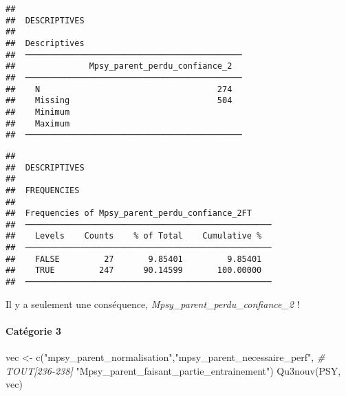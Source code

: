 \documentclass[
]{article}
\newenvironment{Shaded}{\begin{snugshade}}{\end{snugshade}}
\newcommand{\CommentTok}[1]{\textcolor[rgb]{0.56,0.35,0.01}{\textit{#1}}}
\newcommand{\FunctionTok}[1]{\textcolor[rgb]{0.00,0.00,0.00}{#1}}
\newcommand{\NormalTok}[1]{#1}
\newcommand{\OtherTok}[1]{\textcolor[rgb]{0.56,0.35,0.01}{#1}}
\newcommand{\StringTok}[1]{\textcolor[rgb]{0.31,0.60,0.02}{#1}}
\begin{document}
\begin{verbatim}
## 
##  DESCRIPTIVES
## 
##  Descriptives                                 
##  ──────────────────────────────────────────── 
##               Mpsy_parent_perdu_confiance_2   
##  ──────────────────────────────────────────── 
##    N                                    274   
##    Missing                              504   
##    Minimum                                    
##    Maximum                                    
##  ────────────────────────────────────────────
\end{verbatim}

\begin{verbatim}
## 
##  DESCRIPTIVES
## 
##  FREQUENCIES
## 
##  Frequencies of Mpsy_parent_perdu_confiance_2FT     
##  ────────────────────────────────────────────────── 
##    Levels    Counts    % of Total    Cumulative %   
##  ────────────────────────────────────────────────── 
##    FALSE         27       9.85401         9.85401   
##    TRUE         247      90.14599       100.00000   
##  ──────────────────────────────────────────────────
\end{verbatim}

Il y a seulement une conséquence,
\emph{Mpsy\_parent\_perdu\_confiance\_2} !

\hypertarget{catuxe9gorie-3-2}{%
\paragraph{Catégorie 3}\label{catuxe9gorie-3-2}}

\begin{Shaded}
\begin{Highlighting}[]
\NormalTok{vec }\OtherTok{\textless{}{-}} \FunctionTok{c}\NormalTok{(}\StringTok{"mpsy\_parent\_normalisation"}\NormalTok{,}\StringTok{"mpsy\_parent\_necessaire\_perf"}\NormalTok{,  }\CommentTok{\# TOUT[236{-}238]}
                 \StringTok{"Mpsy\_parent\_faisant\_partie\_entrainement"}\NormalTok{)}
\FunctionTok{Qu3nouv}\NormalTok{(PSY, vec)}
\end{Highlighting}
\end{Shaded}
\end{document}
